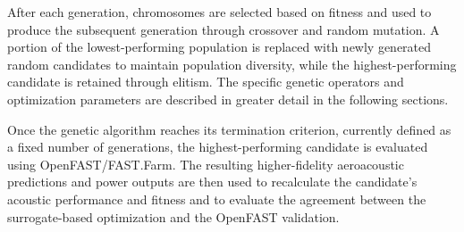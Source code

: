 \documentclass[11pt]{article}
\begin{document}
After each generation, chromosomes are selected based on fitness and used to produce the subsequent generation through crossover and random mutation. A portion of the lowest-performing population is replaced with newly generated random candidates to maintain population diversity, while the highest-performing candidate is retained through elitism. The specific genetic operators and optimization parameters are described in greater detail in the following sections.

Once the genetic algorithm reaches its termination criterion, currently defined as a fixed number of generations, the highest-performing candidate is evaluated using OpenFAST/FAST.Farm. The resulting higher-fidelity aeroacoustic predictions and power outputs are then used to recalculate the candidate's acoustic performance and fitness and to evaluate the agreement between the surrogate-based optimization and the OpenFAST validation.
\end{document}
